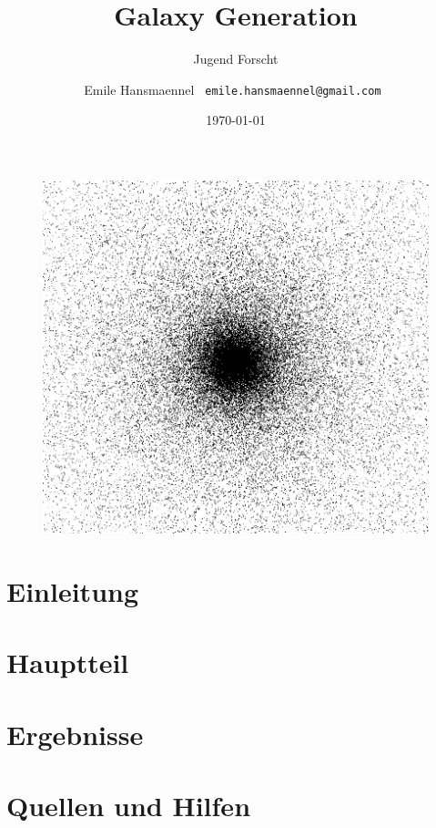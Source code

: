 \documentclass[a4paper,10pt]{scrartcl}
\begin{document}
\title{Galaxy Generation}
\subtitle{Jugend Forscht \the\year}
\author{ Emile Hansmaennel \texttt{ emile.hansmaennel@gmail.com }}
\date{\today}

\maketitle

\begin{figure}[h]
  \centering
  \includegraphics[width=120mm, trim={0 8.5cm 0 8.5cm}, clip]{figs/galaxy}
  \captionsetup{labelformat=empty}
  \caption{}
 \end{figure}

\begin{abstract}

\end{abstract}

\thispagestyle{empty}
\clearpage
\newpage
\setcounter{page}{1}

\tableofcontents
\newpage

\section{Einleitung} \label{Einleitung}

\newpage

\section{Hauptteil} \label{Hauptteil}

\newpage

\section{Ergebnisse} \label{ergebnisse}

\newpage

\section{Quellen und Hilfen} \label{quellen}


\newpage
\end{document}
